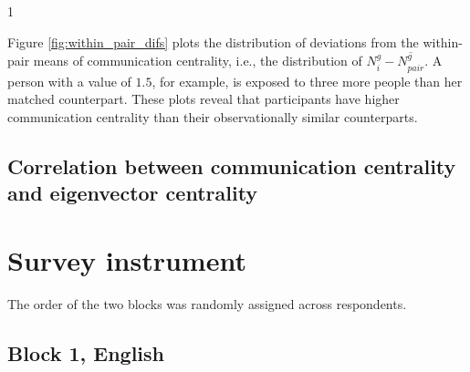 \documentclass[12pt]{article}
\newcommand{\jop}{0} %
\begin{document}
\if\jop1
\linespread{2}\selectfont
\fi


Figure \ref{fig:within_pair_difs} plots the distribution of deviations from the within-pair means of communication centrality, i.e., the distribution of $N_{i}^g-\overline{N_{pair}^g}$. A person with a value of $1.5$, for example, is exposed to three more people than her matched counterpart. These plots reveal that participants have higher communication centrality than their observationally similar counterparts.



\subsection{Correlation between communication centrality and eigenvector centrality}


 	











\newpage

\section{Survey instrument}\label{app:survey}

\singlespacing

The order of the two blocks was randomly assigned across respondents.

 \setlength\itemsep{-0.5em}
\small
\subsection{Block 1, English}
\end{document}
